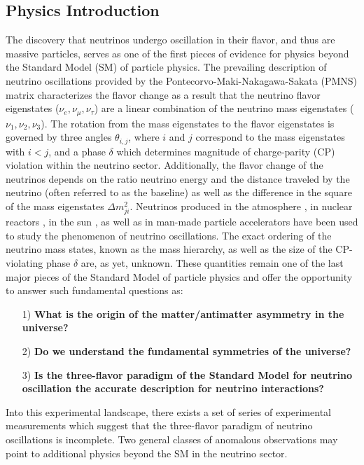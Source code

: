 \subsection{Physics Introduction}
The discovery that neutrinos undergo oscillation in their flavor, and thus are massive particles, serves as one of the first pieces of evidence for physics beyond the Standard Model (SM) of particle physics. The prevailing description of neutrino oscillations provided by the Pontecorvo-Maki-Nakagawa-Sakata (PMNS) matrix characterizes the flavor change as a result that the neutrino flavor eigenstates ($\nu_{e}, \nu_{\mu}, \nu_{\tau}$) are a linear combination of the neutrino mass eigenstates ($\nu_{1}, \nu_{2}, \nu_{3}$). The rotation from the mass eigenstates to the flavor eigenstates is governed by three angles $\theta_{i,j}$, where $i$ and $j$ correspond to the mass eigenstates with $i < j$, and a phase $\delta$ which determines magnitude of charge-parity (CP) violation within the neutrino sector. Additionally, the flavor change of the neutrinos depends on the ratio neutrino energy and the distance traveled by the neutrino (often referred to as the baseline) as well as the difference in the square of the mass eigenstates $\Delta m_{ji}^{2}$. Neutrinos produced in the atmosphere \cite{No1, No2, No3}, in nuclear reactors \cite{No4, No5, No6}, in the sun \cite{No7, No8, No9}, as well as in man-made particle accelerators \cite{No10, No11, No12} have been used to study the phenomenon of neutrino oscillations. The exact ordering of the neutrino mass states, known as the mass hierarchy, as well as the size of the CP-violating phase $\delta$ are, as yet, unknown. These quantities remain one of the last major pieces of the Standard Model of particle physics and offer the opportunity to answer such fundamental questions as:

\begin{itemize}
\item[1)] \textbf{What is the origin of the matter/antimatter asymmetry in the universe?}

\item[2)] \textbf{Do we understand the fundamental symmetries of the universe?}

\item[3)] \textbf{Is the three-flavor paradigm of the Standard Model for neutrino oscillation the accurate description for neutrino interactions?}
\end{itemize}

Into this experimental landscape, there exists a set of series of experimental measurements which suggest that the three-flavor paradigm of neutrino oscillations is incomplete. Two general classes of anomalous observations may point to additional physics beyond the SM  in the neutrino sector.

